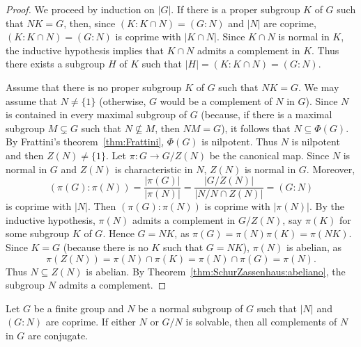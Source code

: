 \begin{proof}
	We proceed by induction on $|G|$. If there is a proper subgroup $K$ of 
	$G$ such that $NK=G$, then, since $(K:K\cap N)=(G:N)$ and $|N|$ are coprime,
	$(K:K\cap N)=(G:N)$ is coprime with $|K\cap N|$. Since $K\cap N$ is normal in $K$,
	the inductive hypothesis implies that $K\cap N$ admits a complement in $K$. Thus there exists 
    a subgroup $H$ of $K$ such that $|H|=(K:K\cap N)=(G:N)$. 

    Assume that there is no proper subgroup $K$ of $G$ such that 
	$NK=G$. We may assume that $N\ne\{1\}$ (otherwise, $G$ would be a complement of $N$ in $G$). Since $N$ is contained in 
    every maximal subgroup of $G$ (because, if there is a maximal subgroup $M\subsetneq G$ such that 
	$N\not\subseteq M$, then $NM=G$), it follows that $N\subseteq\Phi(G)$. By Frattini's theorem~\ref{thm:Frattini}, 
    $\Phi(G)$ is nilpotent. Thus $N$ is nilpotent and then $Z(N)\ne\{1\}$. Let $\pi\colon G\to
	G/Z(N)$ be the canonical map. Since $N$ is normal in $G$ and $Z(N)$ is characteristic in $N$, 
    $Z(N)$ is normal in $G$.  Moreover, 
	\[
	(\pi(G):\pi(N))=\frac{|\pi(G)|}{|\pi(N)|}=\frac{|G/Z(N)|}{|N/N\cap Z(N)|}=(G:N)
	\]
	is coprime with $|N|$. Then $(\pi(G):\pi(N))$ is coprime with $|\pi(N)|$. By the inductive hypothesis, 
	$\pi(N)$ admits a complement in $G/Z(N)$, say $\pi(K)$
	for some subgroup $K$ of $G$. Hence $G=NK$, as 
	$\pi(G)=\pi(N)\pi(K)=\pi(NK)$. 
	Since $K=G$ (because there is no $K$ such that $G=NK$), 
	$\pi(N)$ is abelian, as 
	\[
		\pi(Z(N))=\pi(N)\cap\pi(K)=\pi(N)\cap\pi(G)=\pi(N).
	\]
	Thus $N\subseteq Z(N)$ is abelian. By Theorem~\ref{thm:SchurZassenhaus:abeliano}, the subgroup $N$ 
    admits a complement. 
\end{proof}

\begin{theorem}
	\label{thm:SchurZassenhaus:conjugation}
    Let $G$ be a finite group and $N$ be a normal subgroup of $G$ such that 
    $|N|$ and 
	$(G:N)$ are coprime. If either $N$ or $G/N$ is solvable, then 
    all complements of $N$ in $G$ are conjugate. 
\end{theorem}

%
%
%

